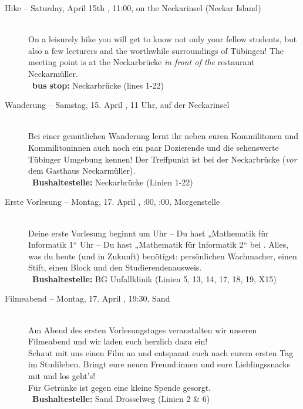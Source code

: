 \begin{description}
\ifml
	\item[Hike -- Saturday, April 15th \YEAR, 11:00, on the Neckarinsel (Neckar Island)]~\\
	On a leisurely hike you will get to know not only your fellow students,
	but also a few lecturers and the worthwhile surroundings of Tübingen!
	The meeting point is at the Neckarbrücke \emph{in front of the} restaurant \glqq Neckarmüller\grqq. \\
	~\textbf{bus stop:} Neckarbrücke (lines 1-22)
\else
	\item[Wanderung -- Samstag, 15. April \YEAR, 11 Uhr, auf der Neckarinsel]~\\
	Bei einer gemütlichen Wanderung lernt ihr neben euren Kommilitonen und Kommilitoninnen auch
	noch ein paar Dozierende und die sehenswerte Tübinger Umgebung kennen!
	Der Treffpunkt ist bei der Neckarbrücke (\emph{vor} dem Gasthaus \glqq Neckarmüller\grqq).\\
	~\textbf{Bushaltestelle:} Neckarbrücke (Linien 1-22)
\fi

\ifbachelor
	\item[Erste Vorlesung -- Montag, 17. April \YEAR, \ifwintersemester 8:00, \else 10:00, \fi Morgenstelle]~\\
	Deine erste Vorlesung beginnt um
	 Uhr -- Du hast „Mathematik für Informatik 1“  \fi
	 Uhr -- Du hast „Mathematik für Informatik 2“  \fi
	bei \Matheprof.
	Alles, was du heute (und in Zukunft) benötigst: persönlichen Wachmacher, einen Stift, einen Block und den Studierendenausweis.\\
	~\textbf{Bushaltestelle:} BG Unfallklinik (Linien 5, 13, 14, 17, 18, 19, X15)
\fi

\ifml
\else
	\item[Filmeabend -- Montag, 17. April \YEAR, 19:30, Sand]~\\
	Am Abend des ersten Vorlesungstages veranstalten wir unseren Filmeabend und wir laden euch herzlich dazu ein!\\
	Schaut mit uns einen Film an und entspannt euch nach eurem ersten Tag im Studileben.
	Bringt eure neuen Freund:innen und eure Lieblingssnacks mit und los geht's!\\
	Für Getränke ist gegen eine kleine Spende gesorgt.\\
	~\textbf{Bushaltestelle:} Sand Drosselweg (Linien 2 \& 6)
\fi


\end{description}
